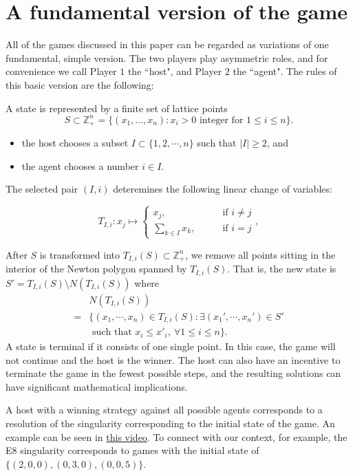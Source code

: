 \documentclass{article}
\theoremstyle{plain}
\theoremstyle{definition}
\theoremstyle{remark}
\newcommand{\ZZ}{{\mathbb{Z}}}
\begin{document}
\section{A fundamental version of the game}\label{fundamental_hironaka_game}
All of the games discussed in this paper can be regarded as variations of one fundamental, simple version. The two players play asymmetric roles, and for convenience we call Player $1$ the ``host", and Player $2$ the ``agent". The rules of this basic version are the following:

A state is represented by a finite set of lattice points 
\[S\subset \mathbb Z_+^n=\{(x_1,\ldots, x_n):x_i>0 \text{ integer for } 1\le i \le n\}.\]

\begin{itemize}
    \item the host chooses a subset $I\subset \{1,2,\cdots, n\}$ such that $|I|\geq 2$, and 
    \item the agent chooses a number $i\in I$.
\end{itemize}

The selected pair $(I,i)$ deteremines the following linear change of variables:

$$T_{I,i}: x_j \mapsto \begin{cases}x_j, &\qquad\text{if } i\neq j \\ \sum\limits_{k\in I} x_k, &\qquad\text{if }i=j
\end{cases},$$

After $S$ is transformed into $T_{I,i}(S) \subset \ZZ_+^n$, we remove all points sitting in the interior of the Newton polygon spanned by $T_{I,i}(S)$. That is, the new state is $S'=T_{I,i}(S) \setminus N(T_{I,i}(S))$ where 
\begin{equation*}
\begin{split}
    &N(T_{I,i}(S)) \\
    = & \{(x_1,\cdots,x_n)\in T_{I,i}(S): \exists (x_1',\cdots,x_n')\in S' \\
    &\text{ such that } x_i\leq x'_i,~ \forall 1\le i \le n\}.
\end{split}
\end{equation*}
A state is terminal if it consists of one single point. In this case, the game will not continue and the host is the winner. The host can also have an incentive to terminate the game in the fewest possible steps, and the resulting solutions can have significant mathematical implications.

A host with a winning strategy against all possible agents corresponds to a resolution of the singularity corresponding to the initial state of the game. An example can be seen in \href{https://www.youtube.com/watch?v=s2LYtd_UPY8}{this video}. To connect with our context, for example, the E8 singularity corresponds to games with the initial state of $\{(2,0,0), (0,3,0), (0,0,5)\}$.
\end{document}
